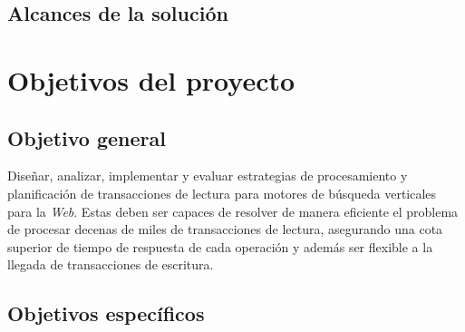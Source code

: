 \subsection{Alcances de la solución}
\label{intro:alcancesdelasolucion}

\section{Objetivos del proyecto}
\label{intro:objetivosysolucion}



\subsection{Objetivo general}
\label{intro:objetivogeneral}
Diseñar, analizar, implementar y evaluar estrategias de procesamiento y planificación de transacciones de lectura para motores de búsqueda verticales para la \textit{Web}. Estas deben ser capaces de resolver de manera eficiente el problema de procesar decenas de miles de transacciones de lectura, asegurando una cota superior de tiempo de respuesta de cada operación y además ser flexible a la llegada de transacciones de escritura. 


\subsection{Objetivos específicos}
\label{intro:objetivosespecificos}



